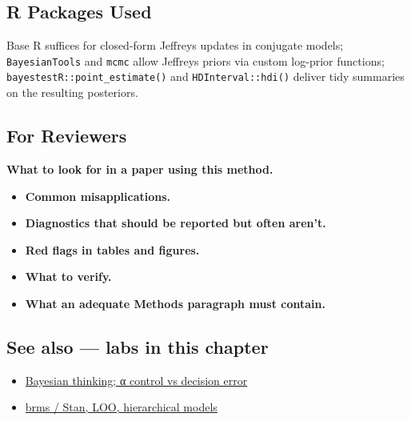 \documentclass[
]{article}
\providecommand{\tightlist}{%
  \setlength{\itemsep}{0pt}\setlength{\parskip}{0pt}}
\begin{document}
\subsection{R Packages Used}\label{r-packages-used}

Base R suffices for closed-form Jeffreys updates in conjugate models;
\texttt{BayesianTools} and \texttt{mcmc} allow Jeffreys priors via
custom log-prior functions; \texttt{bayestestR::point\_estimate()} and
\texttt{HDInterval::hdi()} deliver tidy summaries on the resulting
posteriors.

\subsection{For Reviewers}\label{for-reviewers}

\textbf{What to look for in a paper using this method.}

\begin{itemize}
\tightlist
\item
  \textbf{Common misapplications.}
\item
  \textbf{Diagnostics that should be reported but often aren't.}
\item
  \textbf{Red flags in tables and figures.}
\item
  \textbf{What to verify.}
\item
  \textbf{What an adequate Methods paragraph must contain.}
\end{itemize}

\subsection{See also --- labs in this
chapter}\label{see-also-labs-in-this-chapter}

\begin{itemize}
\tightlist
\item
  \href{labs/lab-bayesian-thinking-control-vs-decision-error.Rmd}{Bayesian
  thinking; α control vs decision error}
\item
  \href{labs/lab-brms-stan-loo-hierarchical-models.Rmd}{brms / Stan,
  LOO, hierarchical models}
\end{itemize}
\end{document}
